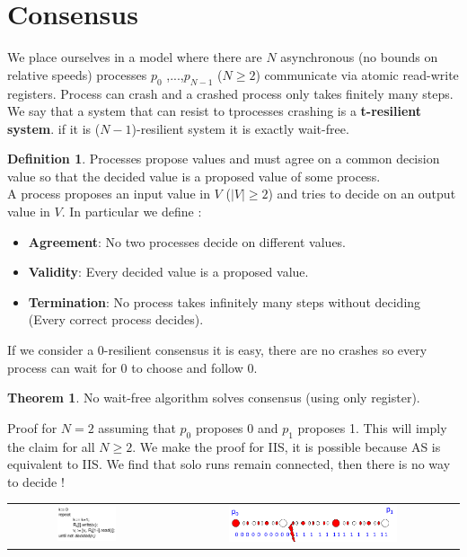 \documentclass{article}
\theoremstyle{definition}
\newtheorem{definition}{Definition}[section]
\newtheorem{theorem}{Theorem}
\begin{document}

\section{Consensus}

We place ourselves in a model where there are $N$ asynchronous (no bounds on relative speeds) processes $p_0$ ,...,$p_{N-1}$ ($N\geq2$) communicate via atomic read-write registers. Process can crash and a crashed process only takes finitely many steps. We say that a system that can resist to tprocesses crashing is a \textbf{t-resilient system}. if it is ($N-1$)-resilient system it is exactly wait-free.

\begin{definition}
Processes propose values and must agree on a common decision value so that the decided value is a proposed value of some process.\\
A process proposes an input value in $V$ ($|V| \geq 2$) and tries to decide on an output value in $V$. In particular we define :
\begin{itemize}
\item \textbf{Agreement}: No two processes decide on different values.
\item \textbf{Validity}: Every decided value is a proposed value.
\item  \textbf{Termination}: No process takes infinitely many steps without deciding (Every correct process decides).
\end{itemize}
\end{definition}

If we consider a 0-resilient consensus it is easy, there are no crashes so every process can wait for 0 to choose and follow 0.

\begin{theorem}
No wait-free algorithm solves consensus (using only register).
\end{theorem}

Proof for $N=2$ assuming that $p_0$ proposes 0 and $p_1$ proposes 1. This will imply the claim for all $N \geq 2$. We make the proof for IIS, it is possible because AS is equivalent to IIS. We find that solo runs remain connected, then there is no way to decide !

\begin{center}
\begin{tabular}{c c}
\includegraphics[width=0.4\textwidth]{cons_imp_1} &
\includegraphics[width=0.6\textwidth]{cons_imp_2}
\end{tabular}
\end{center}
\end{document}
